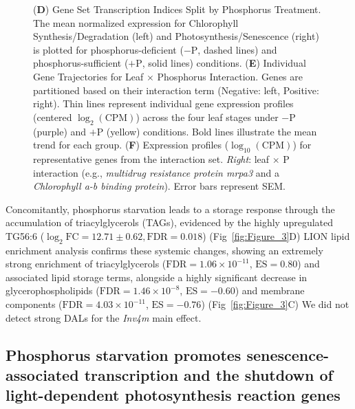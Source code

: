 \documentclass[9pt,twocolumn,twoside]{rilabRxiv}
\newcommand{\invfour}{\textit{Inv4m}\xspace}
\begin{document}
\begin{figure}[!ht]
{(\textbf{D}) Gene Set Transcription Indices Split by Phosphorus Treatment. The mean normalized expression for Chlorophyll Synthesis/Degradation (left) and Photosynthesis/Senescence (right) is plotted for phosphorus-deficient ($-\text{P}$, dashed lines) and phosphorus-sufficient ($+\text{P}$, solid lines) conditions. 
(\textbf{E}) Individual Gene Trajectories for Leaf $\times$ Phosphorus Interaction. Genes are partitioned based on their interaction term (Negative: left, Positive: right). Thin lines represent individual gene expression profiles (centered $\log_{2}(\text{CPM})$) across the four leaf stages under $-\text{P}$ (purple) and $+\text{P}$ (yellow) conditions. Bold lines illustrate the mean trend for each group.
(\textbf{F}) Expression profiles ($\log_{10}(\text{CPM})$) for representative genes from the interaction set. \textit{Right}: leaf $\times$ P interaction (e.g., \textit{multidrug resistance protein mrpa3} and a \textit{Chlorophyll a-b binding protein}). Error bars represent SEM.
}
\label{fig:Figure_5}
\end{figure}
Concomitantly, phosphorus starvation leads to a storage response through the accumulation of triacylglycerols (TAGs), evidenced by the highly upregulated TG56:6 ($\log_2\text{FC}=12.71 \pm 0.62, \text{FDR}=0.018$) (Fig~\ref{fig:Figure_3}D)
LION lipid enrichment analysis confirms these systemic changes, showing an extremely strong enrichment of triacylglycerols ($\text{FDR}=1.06 \times 10^{-11}$, $\text{ES}=0.80$) and associated lipid storage terms, alongside a highly significant decrease in glycerophospholipids ($\text{FDR}=1.46 \times 10^{-8}$, $\text{ES}=-0.60$) and membrane components ($\text{FDR}=4.03 \times 10^{-11}$, $\text{ES}=-0.76$) (Fig~\ref{fig:Figure_3}C)
We did not detect strong DALs for the \invfour main effect.
\subsection*{Phosphorus starvation promotes senescence-associated  transcription and the shutdown of light-dependent photosynthesis reaction genes}
\end{document}
